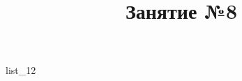 \documentclass[12pt, a4paper]{article}
\begin{document}
	\title{Занятие №8}
	{list_12}
\end{document}
